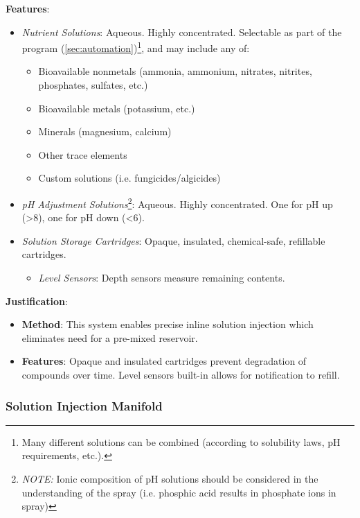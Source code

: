 \documentclass{report}
\begin{document}
\textbf{Features}:
\begin{itemize}
    \item \textit{Nutrient Solutions}: Aqueous. Highly concentrated. Selectable as part of the program (\ref{sec:automation})\footnote{Many different solutions can be combined (according to solubility laws, pH requirements, etc.).}, and may include any of:
    \begin{itemize}
        \item Bioavailable nonmetals (ammonia, ammonium, nitrates, nitrites, phosphates, sulfates, etc.)
        \item Bioavailable metals (potassium, etc.)
        \item Minerals (magnesium, calcium)
        \item Other trace elements
        \item Custom solutions (i.e. fungicides/algicides)
    \end{itemize} 
    \item \textit{pH Adjustment Solutions}\footnote{\textit{NOTE:} Ionic composition of pH solutions should be considered in the understanding of the spray (i.e. phosphic acid results in phosphate ions in spray)}: Aqueous. Highly concentrated. One for pH up (>8), one for pH down (<6).
    \item \textit{Solution Storage Cartridges}: Opaque, insulated, chemical-safe, refillable cartridges.
    \begin{itemize}
        \item \textit{Level Sensors}: Depth sensors measure remaining contents.
    \end{itemize}
\end{itemize}

\textbf{Justification}: 
\begin{itemize}
    \item \textbf{Method}: This system enables precise inline solution injection which eliminates need for a pre-mixed reservoir.
    \item \textbf{Features}: Opaque and insulated cartridges prevent degradation of compounds over time. Level sensors built-in allows for notification to refill.
\end{itemize}

\subsubsection{Solution Injection Manifold}
\label{sec:manifold}
\end{document}
